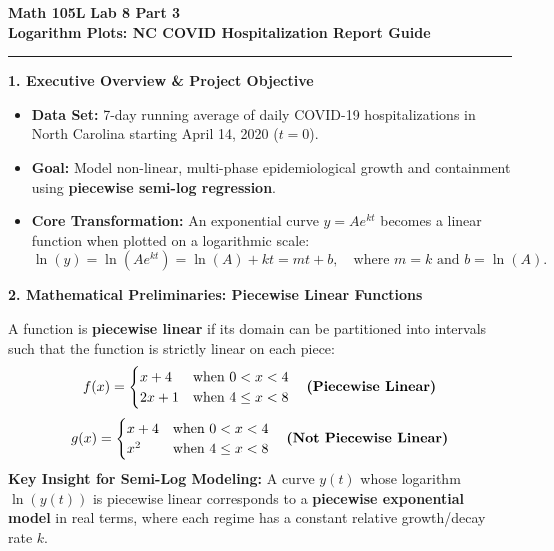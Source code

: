 \documentclass[10.5pt]{article}
\begin{document}
\noindent \textbf{\large Math 105L} \hfill \textbf{\large Lab 8 Part 3}\\[1pt]
{\textbf{\Large Logarithm Plots: NC COVID Hospitalization Report Guide}}\\[-5pt]
\rule{\textwidth}{1.2pt}

\vspace{0.03in}

\textbf{\large 1. Executive Overview \& Project Objective}
\begin{itemize}[leftmargin=1.2em, topsep=1pt, itemsep=2pt]
  \item \textbf{Data Set:} 7-day running average of daily COVID-19 hospitalizations in North Carolina starting April 14, 2020 ($t = 0$).
  \item \textbf{Goal:} Model non-linear, multi-phase epidemiological growth and containment using \textbf{piecewise semi-log regression}.
  \item \textbf{Core Transformation:} An exponential curve $y = A e^{kt}$ becomes a linear function when plotted on a logarithmic scale:
  \[
    \ln(y) = \ln(A e^{kt}) = \ln(A) + kt = m t + b, \quad \text{where } m = k \text{ and } b = \ln(A).
  \]
\end{itemize}

\vspace{0.02in}

\textbf{\large 2. Mathematical Preliminaries: Piecewise Linear Functions}
\begin{tcolorbox}[colback=boxbg, colframe=boxframe, boxrule=0.8pt, arc=3pt, left=8pt, right=8pt, top=4pt, bottom=4pt]
A function is \textbf{piecewise linear} if its domain can be partitioned into intervals such that the function is strictly linear on each piece:
\[
  f(x) = \begin{cases} x + 4 & \text{when } 0 < x < 4 \\ 2x + 1 & \text{when } 4 \le x < 8 \end{cases} \quad \text{\textbf{(Piecewise Linear)}}
\]
\[
  g(x) = \begin{cases} x + 4 & \text{when } 0 < x < 4 \\ x^2 & \text{when } 4 \le x < 8 \end{cases} \quad \text{\textbf{(Not Piecewise Linear)}}
\]
\textbf{Key Insight for Semi-Log Modeling:} A curve $y(t)$ whose logarithm $\ln(y(t))$ is piecewise linear corresponds to a \textbf{piecewise exponential model} in real terms, where each regime has a constant relative growth/decay rate $k$.
\end{tcolorbox}
\end{document}
